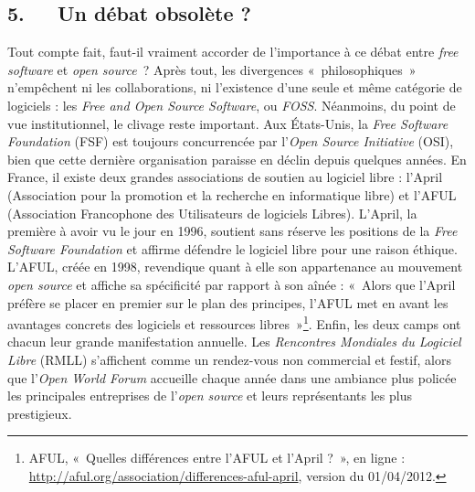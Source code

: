\documentclass{FramateX}
\begin{document}
\begin{refsection}
\section*{5.~~~Un débat obsolète ?}
{}


Tout compte fait, faut-il vraiment accorder de
l'importance à ce débat entre \textit{free software} et \textit{open source~}? Après tout, les divergences
«~philosophiques~» n'empêchent ni les collaborations,
ni l'existence d'une seule et même
catégorie de logiciels : les \textit{Free and Open Source
Software}, ou \textit{FOSS}. Néanmoins, du point de vue
institutionnel, le clivage reste important. Aux États-Unis, la
\textit{Free Software Foundation} (FSF) est toujours
concurrencée par l'\textit{Open Source Initiative} (OSI), bien que
cette dernière organisation paraisse en déclin depuis quelques années.
En France, il existe deux grandes associations de soutien au logiciel
libre : l'April (Association pour la promotion et la recherche en
informatique libre) et l'AFUL (Association Francophone des Utilisateurs
de logiciels Libres). L'April, la première à avoir vu le jour en 1996,
soutient sans réserve les positions de la \textit{Free Software
Foundation} et affirme défendre le logiciel libre pour une raison
éthique. L'AFUL, créée en 1998, revendique quant à elle son
appartenance au mouvement \textit{open source} et affiche sa
spécificité par rapport à son aînée : «~Alors que
l'April préfère se placer en premier sur le plan des
principes, l'AFUL met en avant les avantages concrets
des logiciels et ressources libres~»\footnote{AFUL, «~Quelles
différences entre l'AFUL et l'April ?~», en ligne : \url{http://aful.org/association/differences-aful-april}, version du
01/04/2012.}. Enfin, les deux camps ont chacun leur grande
manifestation annuelle. Les \textit{Rencontres Mondiales du Logiciel
Libre} (RMLL) s'affichent comme un rendez-vous non commercial et
festif, alors que l'\textit{Open World Forum}
accueille chaque année dans une ambiance plus policée les principales
entreprises de l'\textit{open source} et leurs représentants les plus
prestigieux. 


\end{refsection}
\end{document}
